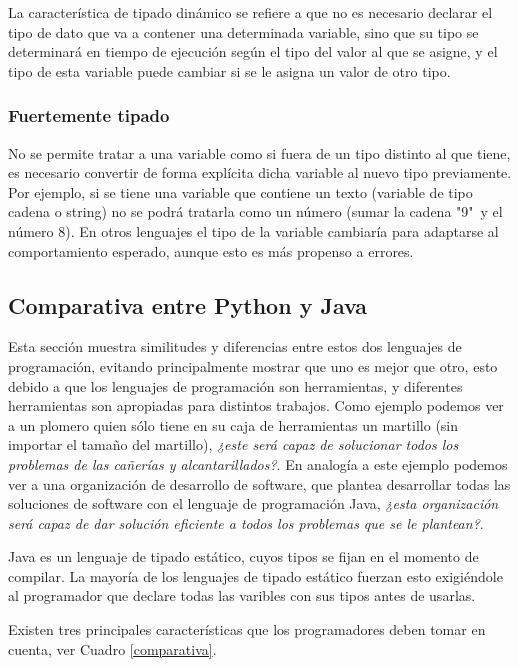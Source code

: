 \documentclass[12pt,legalpaper]{report}
\begin{document}
La característica de tipado dinámico se refiere a que no es necesario declarar el tipo de dato que va a contener una determinada variable, sino que su tipo se determinará en tiempo de ejecución según el tipo del valor al que se asigne, y el tipo de esta variable puede cambiar si se le asigna un valor de otro tipo.


			\subsubsection{Fuertemente tipado}

No se permite tratar a una variable como si fuera de un tipo distinto al que tiene, es necesario convertir de forma explícita dicha variable al nuevo tipo previamente. Por ejemplo, si se tiene una variable que contiene un texto (variable de tipo cadena o string) no se podrá tratarla como un número (sumar la cadena "9"\ y el número 8). En otros lenguajes el tipo de la variable cambiaría para adaptarse al comportamiento esperado, aunque esto es más propenso a errores.

		\subsection{Comparativa entre Python y Java}

Esta sección muestra similitudes y diferencias entre estos dos lenguajes de programación, evitando principalmente mostrar que uno es mejor que otro, esto debido a que los lenguajes de programación son herramientas, y diferentes herramientas son apropiadas para distintos trabajos.  Como ejemplo podemos ver a un plomero quien sólo tiene en su caja de herramientas un martillo (sin importar el tamaño del martillo), \textit{¿este será capaz de solucionar todos los problemas de las cañerías y alcantarillados?}.  En analogía a este ejemplo podemos ver a una organización de desarrollo de software, que plantea desarrollar todas las soluciones de software con el lenguaje de programación Java, \textit{¿esta organización será capaz de dar solución eficiente a todos los problemas que se le plantean?}.

Java es un lenguaje de tipado estático, cuyos tipos se fijan en el momento de compilar. La mayoría de los lenguajes de tipado estático fuerzan esto exigiéndole al programador que declare todas las varibles con sus tipos antes de usarlas. 

Existen tres principales características que los programadores deben tomar en cuenta, ver Cuadro \ref{comparativa}.
\end{document}

